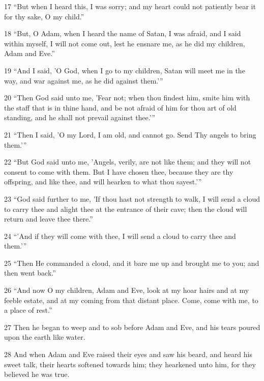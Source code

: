 \par 17 “But when I heard this, I was sorry; and my heart could not patiently bear it for thy sake, O my child.”

\par 18 “But, O Adam, when I heard the name of Satan, I was afraid, and I said within myself, I will not come out, lest he ensnare me, as he did my children, Adam and Eve.”

\par 19 “And I said, 'O God, when I go to my children, Satan will meet me in the way, and war against me, as he did against them.'”

\par 20 “Then God said unto me, 'Fear not; when thou findest him, smite him with the staff that is in thine hand, and be not afraid of him for thou art of old standing, and he shall not prevail against thee.'”

\par 21 “Then I said, 'O my Lord, I am old, and cannot go. Send Thy angels to bring them.'”

\par 22 “But God said unto me, 'Angels, verily, are not like them; and they will not consent to come with them. But I have chosen thee, because they are thy offspring, and like thee, and will hearken to what thou sayest.'”

\par 23 “God said further to me, 'If thou hast not strength to walk, I will send a cloud to carry thee and alight thee at the entrance of their cave; then the cloud will return and leave thee there.”

\par 24 “'And if they will come with thee, I will send a cloud to carry thee and them.'”

\par 25 “Then He commanded a cloud, and it bare me up and brought me to you; and then went back.”

\par 26 “And now O my children, Adam and Eve, look at my hoar hairs and at my feeble estate, and at my coming from that distant place. Come, come with me, to a place of rest.”

\par 27 Then he began to weep and to sob before Adam and Eve, and his tears poured upon the earth like water.

\par 28 And when Adam and Eve raised their eyes and saw his beard, and heard his sweet talk, their hearts softened towards him; they hearkened unto him, for they believed he was true.


